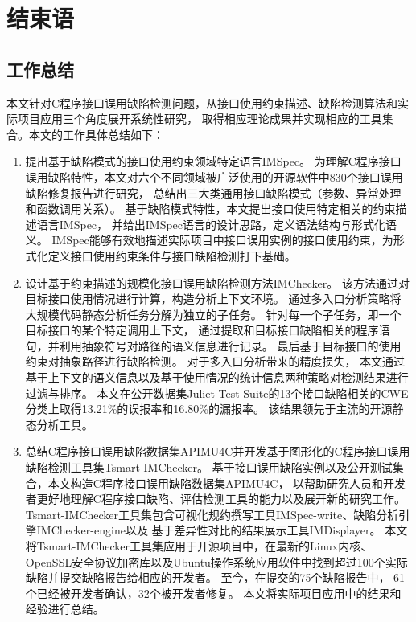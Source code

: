 \chapter{结束语}
\label{cha:con}

\section{工作总结}
本文针对C程序接口误用缺陷检测问题，从接口使用约束描述、缺陷检测算法和实际项目应用三个角度展开系统性研究，
取得相应理论成果并实现相应的工具集合。本文的工作具体总结如下：
\begin{enumerate}
	\item 提出基于缺陷模式的接口使用约束领域特定语言IMSpec。
	为理解C程序接口误用缺陷特性，本文对六个不同领域被广泛使用的开源软件中830个接口误用缺陷修复报告进行研究，
	总结出三大类通用接口缺陷模式（参数、异常处理和函数调用关系）。
	基于缺陷模式特性，本文提出接口使用特定相关的约束描述语言IMSpec，
	并给出IMSpec语言的设计思路，定义语法结构与形式化语义。
	IMSpec能够有效地描述实际项目中接口误用实例的接口使用约束，为形式化定义接口使用约束条件与接口缺陷检测打下基础。
	
	\item 设计基于约束描述的规模化接口误用缺陷检测方法IMChecker。
	该方法通过对目标接口使用情况进行计算，构造分析上下文环境。
	通过多入口分析策略将大规模代码静态分析任务分解为独立的子任务。
	针对每一个子任务，即一个目标接口的某个特定调用上下文，
	通过提取和目标接口缺陷相关的程序语句，并利用抽象符号对路径的语义信息进行记录。
	最后基于目标接口的使用约束对抽象路径进行缺陷检测。
	对于多入口分析带来的精度损失，
	本文通过基于上下文的语义信息以及基于使用情况的统计信息两种策略对检测结果进行过滤与排序。
	本文在公开数据集Juliet Test Suite的13个接口缺陷相关的CWE分类上取得13.21\%的误报率和16.80\%的漏报率。
	该结果领先于主流的开源静态分析工具。
	
	\item 总结C程序接口误用缺陷数据集APIMU4C并开发基于图形化的C程序接口误用缺陷检测工具集Tsmart-IMChecker。
	基于接口误用缺陷实例以及公开测试集合，本文构造C程序接口误用缺陷数据集APIMU4C，
	以帮助研究人员和开发者更好地理解C程序接口缺陷、评估检测工具的能力以及展开新的研究工作。
	Tsmart-IMChecker工具集包含可视化规约撰写工具IMSpec-write、缺陷分析引擎IMChecker-engine以及
	基于差异性对比的结果展示工具IMDisplayer。
	本文将Tsmart-IMChecker工具集应用于开源项目中，在最新的Linux内核、
	OpenSSL安全协议加密库以及Ubuntu操作系统应用软件中找到超过100个实际缺陷并提交缺陷报告给相应的开发者。
	至今，在提交的75个缺陷报告中，
	61个已经被开发者确认，32个被开发者修复。
	本文将实际项目应用中的结果和经验进行总结。
	
	
\end{enumerate}


